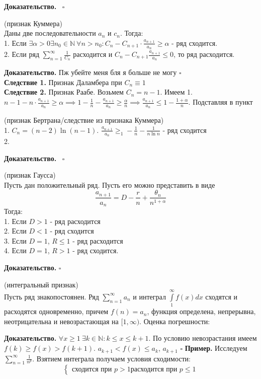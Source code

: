 \textbf{Доказательство.}  \
$\square$ 
\begin{theor}
    (признак Куммера)\\
    Даны две последовательности $a_n$ и  $c_n$. Тогда:\\
    1. Если $\exists \alpha>0\exists n_0\in\mathbb{N}~\forall n>n_0:
    C_n-C_{n+1}\cdot \frac{a_{n+1}}{a_n}\geqslant\alpha$ - ряд сходится.\\
    2. Если ряд $\sum\limits_{n=1}^{\infty} \frac{1}{C_n}$ расходится 
    и $C_n-C_{n+1} \frac{a_{n+1}}{a_n}\leqslant 0$, то ряд расходится.
\end{theor}
\textbf{Доказательство.} Пж убейте меня бля я больше не могу
$\square$ \\
\textbf{Следствие 1.} Признак Даламбера при $C_n\equiv1$\\
\textbf{Следствие 2.} Признак Раабе. Возьмем $C_n=n-1$. Имеем 
1. $n-1-n\cdot \frac{a_{n+1}}{a_n}\geqslant\alpha\implies1-\frac{1}{n}
-\frac{a_{n+1}}{a_n}\geqslant\frac{\alpha}{n}\implies\frac{a_{n+1}}{a_n}
\leqslant 1-\frac{1+\alpha}{n}$. Подставляя в пункт  
\begin{theor}
    (признак Бертрана/следствие из признака Куммера)\\
    1. $C_n=(n-2)\ln(n-1)$. $\frac{a_{n+1}}{a_n}\geqslant_1-\frac{1}{n}
    -\frac{1}{n\ln{n}}$ - ряд сходится\\
    2. 

\end{theor}
\textbf{Доказательство.}  \
$\square$ 
\begin{theor}
    (признак Гаусса)\\
    Пусть дан положительный ряд. Пусть его можно представить в виде
    $$\frac{a_{n+1}}{a_n}=D-\frac{r}{n}+ \frac{\theta_n}{n^{1+\alpha}}$$ 
    Тогда:\\
    1. Если $D>1$ - ряд расходится\\
    2. Если $D<1$ - ряд сходится\\
    3. Если $D=1$,  $R\leqslant 1$ - ряд расходится\\
    4. Если $D=1$,  $R>1$ - ряд сходится. 
\end{theor}
\textbf{Доказательство.}
$\square$ 
\begin{theor}
    (интегральный признак)\\
    Пусть ряд знакопостоянен. 
    Ряд $\sum\limits_{n=1}^{\infty} a_n$ и интеграл $\int\limits^\infty_1
    f(x)dx$ сходятся и расходятся одновременно, причем $f(n)=a_n$, функция
    определена, непрерывна, неотрицательна и невозрастающая на  $[1,\infty)$.
    Оценка погрешности: 

\end{theor}
\textbf{Доказательство.} $\forall x\geqslant1~\exists k\in\mathbb{N}:
k\leqslant x\leqslant k+1$.  По условию невозрастания имеем $f(k)\geqslant 
f(x)>f(k+1)$. $a_{k+1}<f(x)\leqslant a_k$,  $a_{k+1}$
$\square$ 
\textbf{Пример.} Исследуем $\sum\limits_{n=1}^{\infty} \frac{1}{n^p}$. Взятием
интеграла получаем условия сходимости:
$$
\begin{cases}
    \text{сходится при } p>1   
    \text{расходится при } p\leqslant 1
\end{cases}$$

